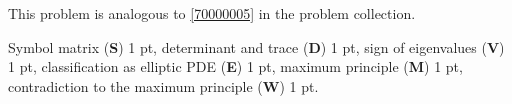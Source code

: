 \begin{diskussion}
This problem is analogous to
\ref{70000005} in the problem collection.
\end{diskussion}

\begin{bewertung}
Symbol matrix ({\bf S}) 1 pt,
determinant and trace ({\bf D}) 1 pt,
sign of eigenvalues ({\bf V}) 1 pt,
classification as elliptic PDE ({\bf E}) 1 pt,
maximum principle ({\bf M}) 1 pt,
contradiction to the maximum principle ({\bf W}) 1 pt.
\end{bewertung}
